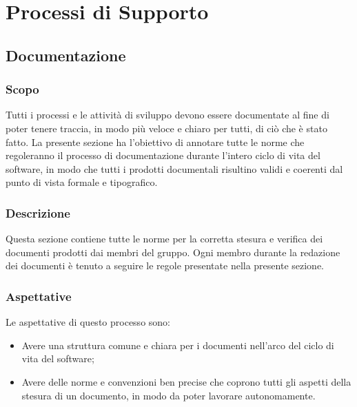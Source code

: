 \chapter{Processi di Supporto}

\section{Documentazione}
\subsection{Scopo}
Tutti i processi e le attività di sviluppo devono essere documentate al fine di poter tenere traccia, in modo più veloce e chiaro per tutti, di ciò che è stato fatto. La presente sezione ha l'obiettivo di annotare tutte le norme che regoleranno il processo di documentazione durante l'intero ciclo di vita del software, in modo che tutti i prodotti documentali risultino validi e coerenti dal punto di vista formale e tipografico.
\subsection{Descrizione}
Questa sezione contiene tutte le norme per la corretta stesura e verifica dei documenti prodotti dai membri del gruppo. Ogni membro durante la redazione dei documenti è tenuto a seguire le regole presentate nella presente sezione.
\subsection{Aspettative}
Le aspettative di questo processo sono:
\begin{itemize}
    \item Avere una struttura comune e chiara per i documenti nell'arco del ciclo di vita del software;
    \item Avere delle norme e convenzioni ben precise che coprono tutti gli aspetti della stesura di un
documento, in modo da poter lavorare autonomamente.
\end{itemize}
